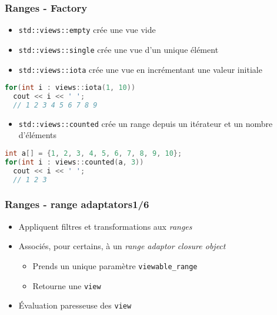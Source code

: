 \documentclass[C++.tex]{subfiles}
\begin{document}
\begin{frame}[fragile]
	\frametitle{Ranges - Factory}
	\begin{itemize}
		\item \lstinline|std::views::empty| crée une vue vide
		\item \lstinline|std::views::single| crée une vue d'un unique élément
		\item \lstinline|std::views::iota| crée une vue en incrémentant une valeur initiale
	\end{itemize}
	
	\begin{lstlisting}[language=C++]
for(int i : views::iota(1, 10))
  cout << i << ' ';
  // 1 2 3 4 5 6 7 8 9\end{lstlisting}
	
	\begin{itemize}
		\item \lstinline|std::views::counted| crée un range depuis un itérateur et un nombre d'éléments
	\end{itemize}
	
	\begin{lstlisting}[language=C++]
int a[] = {1, 2, 3, 4, 5, 6, 7, 8, 9, 10};
for(int i : views::counted(a, 3))
  cout << i << ' ';
  // 1 2 3\end{lstlisting}
\end{frame}

\begin{frame}[fragile]
	\frametitle{Ranges - range adaptators\titlehfill{}1/6}
	\begin{itemize}
		\item Appliquent filtres et transformations aux \textit{ranges}
		\item Associés, pour certains, à un \textit{range adaptor closure object}
		\begin{itemize}
			\item Prends un unique paramètre \lstinline|viewable_range|
			\item Retourne une \lstinline|view|
		\end{itemize}
		\item Évaluation paresseuse des \lstinline|view|
	\end{itemize}
\end{frame}
\end{document}
